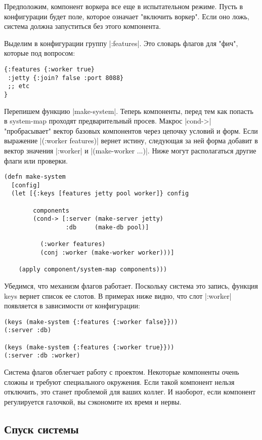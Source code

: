 Предположим, компонент воркера все еще в испытательном режиме. Пусть в
конфигурации будет поле, которое означает "включить воркер". Если оно ложь,
система должна запуститься без этого компонента.

Выделим в конфигурации группу \spverb|:features|. Это словарь флагов для "фич", которые
под вопросом:

\begin{verbatim}
{:features {:worker true}
 :jetty {:join? false :port 8088}
 ;; etc
}
\end{verbatim}

Перепишем функцию \spverb|make-system|. Теперь компоненты, перед тем как попасть в
system-map проходят предварительный просев. Макрос \spverb|cond->| "пробрасывает"
вектор базовых компонентов через цепочку условий и форм. Если выражение
\spverb|(:worker features)| вернет истину, следующая за ней форма добавит в вектор
значения \spverb|:worker| и \spverb|(make-worker {...})|. Ниже могут располагаться другие
флаги или проверки.

\begin{verbatim}
(defn make-system
  [config]
  (let [{:keys [features jetty pool worker]} config

        components
        (cond-> [:server (make-server jetty)
                 :db     (make-db pool)]

          (:worker features)
          (conj :worker (make-worker worker)))]

    (apply component/system-map components)))
\end{verbatim}

Убедимся, что механизм флагов работает. Поскольку система это запись, функция
keys вернет список ее слотов. В примерах ниже видно, что слот \spverb|:worker|
появляется в зависимости от конфигурации:

\begin{verbatim}
(keys (make-system {:features {:worker false}}))
(:server :db)

(keys (make-system {:features {:worker true}}))
(:server :db :worker)
\end{verbatim}

Система флагов облегчает работу с проектом. Некоторые компоненты очень сложны и
требуют специального окружения. Если такой компонент нельзя отключить, это
станет проблемой для ваших коллег. И наоборот, если компонент регулируется
галочкой, вы сэкономите их время и нервы.

\subsection{Спуск системы}


